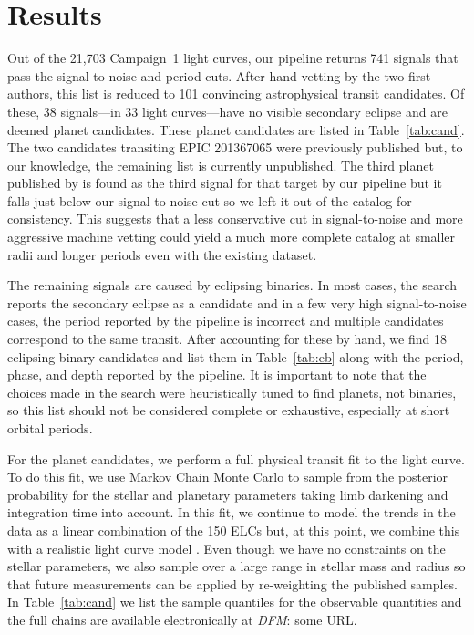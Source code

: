\documentclass[12pt,preprint]{aastex}
\newcommand{\Tab}[1]{Table~\ref{tab:#1}}
\newcommand{\tab}[1]{\Tab{#1}}
\newcommand{\sectlabel}[1]{\label{sect:#1}}
\newcommand{\todo}[3]{{\color{#2}\emph{#1}: #3}}
\newcommand{\dfmtodo}[1]{\todo{DFM}{red}{#1}}
\begin{document}
\section{Results}
\sectlabel{results}

Out of the 21,703 Campaign~1 light curves, our pipeline returns 741 signals
that pass the signal-to-noise and period cuts.
After hand vetting by the two first authors, this list is reduced to 101
convincing astrophysical transit candidates.
Of these, 38 signals---in 33 light curves---have no visible secondary
eclipse and are deemed planet candidates.
These planet candidates are listed in \tab{cand}.
The two candidates transiting EPIC 201367065 were previously published
\citep{Crossfield:2015} but, to our knowledge, the remaining list is currently
unpublished.
The third planet published by \citet{Crossfield:2015} is found as the third
signal for that target by our pipeline but it falls just below our
signal-to-noise cut so we left it out of the catalog for consistency.
This suggests that a less conservative cut in signal-to-noise and more
aggressive machine vetting could yield a much more complete catalog at smaller
radii and longer periods even with the existing dataset.

The remaining signals are caused by eclipsing binaries.
In most cases, the search reports the secondary eclipse as a candidate and in
a few very high signal-to-noise cases, the period reported by the pipeline is
incorrect and multiple candidates correspond to the same transit.
After accounting for these by hand, we find 18 eclipsing binary candidates
and list them in \tab{eb} along with the period, phase, and depth reported by
the pipeline.
It is important to note that the choices made in the search were
heuristically tuned to find planets, not binaries, so this list should not be
considered complete or exhaustive, especially at short orbital periods.

For the planet candidates, we perform a full physical transit fit to the light
curve.
To do this fit, we use Markov Chain Monte Carlo \citep[MCMC;][]{emcee} to
sample from the posterior probability for the stellar and planetary
parameters taking limb darkening and integration time into account.
In this fit, we continue to model the trends in the data as a linear
combination of the 150 ELCs but, at this point, we combine this with a
realistic light curve model \citet{ma, kipping-ld}.
Even though we have no constraints on the stellar parameters, we also sample
over a large range in stellar mass and radius so that future measurements can
be applied by re-weighting the published samples.
In \tab{cand} we list the sample quantiles for the observable quantities and
the full chains are available electronically at \dfmtodo{some URL}.
\end{document}

